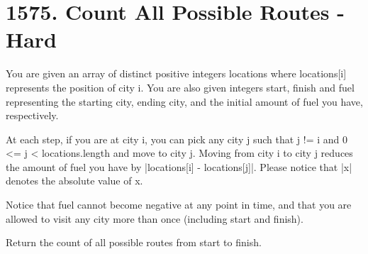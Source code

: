 \documentclass[9pt, b5paaper]{book}
\begin{document}
\section{1575. Count All Possible Routes - Hard}
\label{sec-2-12}
You are given an array of distinct positive integers locations where locations[i] represents the position of city i. You are also given integers start, finish and fuel representing the starting city, ending city, and the initial amount of fuel you have, respectively.

At each step, if you are at city i, you can pick any city j such that j != i and 0 <= j < locations.length and move to city j. Moving from city i to city j reduces the amount of fuel you have by |locations[i] - locations[j]|. Please notice that |x| denotes the absolute value of x.

Notice that fuel cannot become negative at any point in time, and that you are allowed to visit any city more than once (including start and finish).

Return the count of all possible routes from start to finish.
\end{document}
